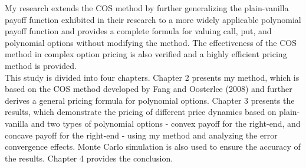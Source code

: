  My research extends the COS method by further generalizing the plain-vanilla payoff function exhibited in their research to a more widely applicable polynomial payoff function and provides a complete formula for valuing call, put, and polynomial options without modifying the method. The effectiveness of the COS method in complex option pricing is also verified and a highly efficient pricing method is provided.\\

 This study is divided into four chapters. Chapter 2 presents my method, which is based on the COS method developed by Fang and Oosterlee (2008) and further derives a general pricing formula for polynomial options. Chapter 3 presents the results, which demonstrate the pricing of different price dynamics based on plain-vanilla and two types of polynomial options - convex payoff for the right-end, and concave payoff for the right-end - using my method and analyzing the error convergence effects. Monte Carlo simulation is also used to ensure the accuracy of the results. Chapter 4 provides the conclusion.\\